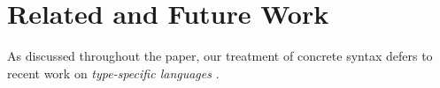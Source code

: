 \documentclass[10pt,preprint]{sigplanconf}
\begin{document}

\section{Related and Future Work}\label{prior-work}
As discussed throughout the paper, our treatment of concrete syntax defers to recent work on \emph{type-specific languages} \cite{TSLs}. %
\end{document}

